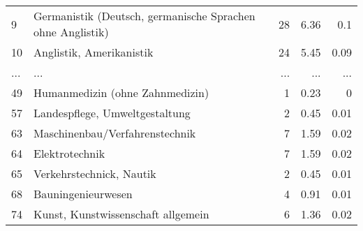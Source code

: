 \begin{longtable}{lXrrr}
        9 & \multicolumn{1}{X}{Germanistik (Deutsch, germanische Sprachen ohne Anglistik)} & %
          \num{28} &
          \num[round-mode=places,round-precision=2]{6,36} &
          \num[round-mode=places,round-precision=2]{0,1} \\
        10 & \multicolumn{1}{X}{Anglistik, Amerikanistik} & %
          \num{24} &
          \num[round-mode=places,round-precision=2]{5,45} &
          \num[round-mode=places,round-precision=2]{0,09} \\
       ... & ... & ... & ... & ... \\
        49 & \multicolumn{1}{X}{Humanmedizin (ohne Zahnmedizin)} & %
          \num{1} &
          \num[round-mode=places,round-precision=2]{0,23} &
          \num[round-mode=places,round-precision=2]{0} \\

        57 & \multicolumn{1}{X}{Landespflege, Umweltgestaltung} & %
          \num{2} &
          \num[round-mode=places,round-precision=2]{0,45} &
          \num[round-mode=places,round-precision=2]{0,01} \\

        63 & \multicolumn{1}{X}{Maschinenbau/Verfahrenstechnik} & %
          \num{7} &
          \num[round-mode=places,round-precision=2]{1,59} &
          \num[round-mode=places,round-precision=2]{0,02} \\

        64 & \multicolumn{1}{X}{Elektrotechnik} & %
          \num{7} &
          \num[round-mode=places,round-precision=2]{1,59} &
          \num[round-mode=places,round-precision=2]{0,02} \\

        65 & \multicolumn{1}{X}{Verkehrstechnick, Nautik} & %
          \num{2} &
          \num[round-mode=places,round-precision=2]{0,45} &
          \num[round-mode=places,round-precision=2]{0,01} \\

        68 & \multicolumn{1}{X}{Bauningenieurwesen} & %
          \num{4} &
          \num[round-mode=places,round-precision=2]{0,91} &
          \num[round-mode=places,round-precision=2]{0,01} \\

        74 & \multicolumn{1}{X}{Kunst, Kunstwissenschaft allgemein} & %
          \num{6} &
          \num[round-mode=places,round-precision=2]{1,36} &
          \num[round-mode=places,round-precision=2]{0,02} \\


\end{longtable}
